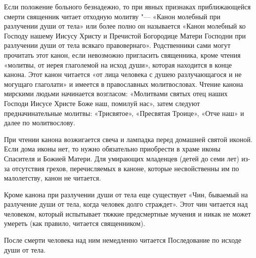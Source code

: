 \begin{mymulticols}
 

Если положение больного безнадежно, то при явных признаках приближающейся смерти священник читает отходную молитву "--- «Канон молебный при разлучении души от тела» или более полно он называется «Канон молебный ко Господу нашему Иисусу Христу и Пречистой Богородице Матери Господни при разлучении души от тела всякаго правовернаго». Родственники сами могут прочитать этот канон, если невозможно пригласить священника, кроме чтения «молитвы, от иерея глаголемой на исход души», которая находится в конце канона. Этот канон читается «от лица человека с душею разлучающагося и не могущаго глаголати» и имеется в православных молитвословах. Чтение канона мирскими людьми начинается возгласом: «Молитвами святых отец наших Господи Иисусе Христе Боже наш, помилуй нас», затем следуют предначинательные молитвы: «Трисвятое», «Пресвятая Троице», «Отче наш» и далее по молитвослову. 

При чтении канона возжигается свеча и лампадка перед домашней святой иконой. Если дома иконы нет, то нужно обязательно приобрести в храме иконы Спасителя и Божией Матери. Для умирающих младенцев (детей до семи лет) из-за отсутствия грехов, перечисляемых в каноне, которые несвойственны им по малолетству, канон не читается. 

Кроме канона при разлучении души от тела еще существует «Чин, бываемый на разлучение души от тела, когда человек долго страждет». Этот чин читается над человеком, который испытывает тяжкие предсмертные мучения и никак не может умереть (как правило, читается священником). 

После смерти человека над ним немедленно читается Последование по исходе души от тела. 

\end{mymulticols}

\mychapterending

